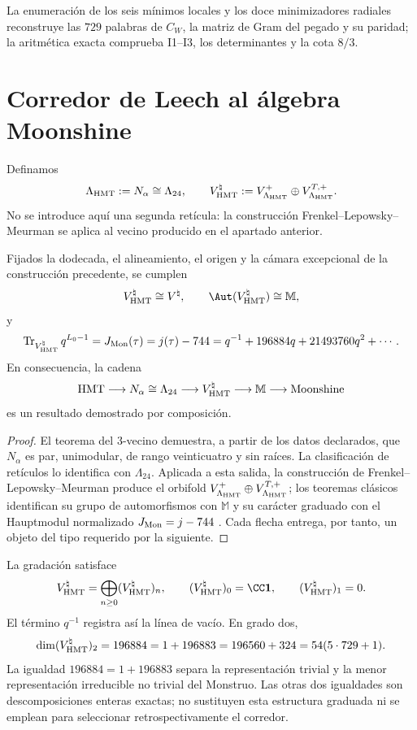 La enumeración de los seis mínimos locales y los doce minimizadores radiales
reconstruye las \(729\) palabras de \(C_W\), la matriz de Gram del pegado y
su paridad; la aritmética exacta comprueba I1--I3, los determinantes y la cota
\(8/3\).

\section{Corredor de Leech al álgebra Moonshine}
\label{sec:corredor-hmt-moonshine}

Definamos
\[
 \Lambda_{\rm HMT}:=N_\alpha\cong\Lambda_{24},
 \qquad
 V^\natural_{\rm HMT}
 :=V_{\Lambda_{\rm HMT}}^+
 \oplus V_{\Lambda_{\rm HMT}}^{T,+}.
\]
No se introduce aquí una segunda retícula: la construcción
Frenkel--Lepowsky--Meurman se aplica al vecino producido en el apartado
anterior.

\begin{theorem}
\label{thm:corredor-hmt-moonshine}
Fijados la dodecada, el alineamiento, el origen y la cámara excepcional de la
construcción precedente, se cumplen
\[
 V^\natural_{\rm HMT}\cong V^\natural,
 \qquad
 \Aut(V^\natural_{\rm HMT})\cong\mathbb M,
\]
y
\[
 \operatorname{Tr}_{V^\natural_{\rm HMT}}q^{L_0-1}
 =J_{\rm Mon}(\tau)
 =j(\tau)-744
 =q^{-1}+196884q+21493760q^2+\cdots .
\]
En consecuencia, la cadena
\[
 \mathrm{HMT}\longrightarrow N_\alpha\cong\Lambda_{24}
 \longrightarrow V^\natural_{\rm HMT}
 \longrightarrow\mathbb M
 \longrightarrow\text{\rm Moonshine}
\]
es un resultado demostrado por composición.
\end{theorem}

\begin{proof}
El teorema del 3-vecino demuestra, a partir de los datos declarados, que
\(N_\alpha\) es par, unimodular, de rango veinticuatro y sin raíces. La
clasificación de retículos lo identifica con \(\Lambda_{24}\). Aplicada a
esta salida, la construcción de Frenkel--Lepowsky--Meurman produce el
orbifold
\(V_{\Lambda_{\rm HMT}}^+\oplus V_{\Lambda_{\rm HMT}}^{T,+}\);
los teoremas clásicos identifican su grupo de automorfismos con
\(\mathbb M\) y su carácter graduado con el Hauptmodul normalizado
\(J_{\rm Mon}=j-744\)
\cite{FLM1988,ConwayNorton1979,Borcherds1992}. Cada flecha entrega, por
tanto, un objeto del tipo requerido por la siguiente.\qedhere
\end{proof}

\begin{remark}
La gradación satisface
\[
 V^\natural_{\rm HMT}
 =\bigoplus_{n\geq0}(V^\natural_{\rm HMT})_n,
 \qquad
 (V^\natural_{\rm HMT})_0=\CC\mathbf1,
 \qquad
 (V^\natural_{\rm HMT})_1=0.
\]
El término \(q^{-1}\) registra así la línea de vacío. En grado dos,
\[
 \dim(V^\natural_{\rm HMT})_2
 =196884
 =1+196883
 =196560+324
 =54(5\cdot729+1).
\]
La igualdad \(196884=1+196883\) separa la representación trivial y la menor
representación irreducible no trivial del Monstruo. Las otras dos igualdades
son descomposiciones enteras exactas; no sustituyen esta estructura graduada
ni se emplean para seleccionar retrospectivamente el corredor.
\end{remark}


